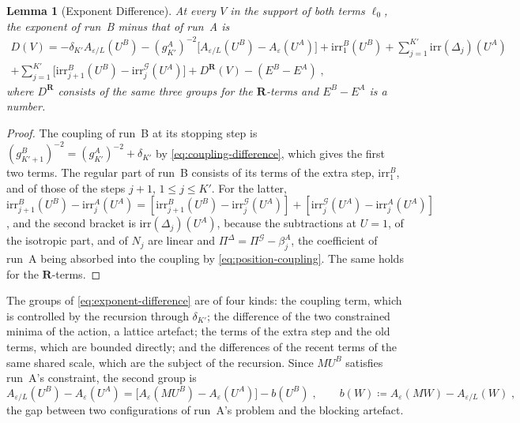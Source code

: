 \documentclass[11pt]{preprint}
\numberwithin{equation}{section}
\newtheorem{lemma}[theorem]{Lemma}
\theoremstyle{definition}
\theoremstyle{remark}
\theoremstyle{plain}
\begin{document}
\begin{lemma}[Exponent Difference]\label{lem:exponent-difference}
At every $V$ in the support of both terms $\ell_0$, the exponent of run~B minus that of run~A is
\begin{multline}\label{eq:exponent-difference}
    D(V) = -\delta_{K'}A_{\varepsilon/L}(U^B) - (g^A_{K'})^{-2}\bigl[A_{\varepsilon/L}(U^B) - A_\varepsilon(U^A)\bigr] + \mathrm{irr}^B_1(U^B) + \sum_{j=1}^{K'}\mathrm{irr}(\Delta_j)(U^A)\\
    + \sum_{j=1}^{K'}\bigl[\mathrm{irr}^B_{j+1}(U^B) - \mathrm{irr}^{\mathcal G}_j(U^A)\bigr] + D^{\mathbf R}(V) - (E^B - E^A)\;,
\end{multline}
where $D^{\mathbf R}$ consists of the same three groups for the $\mathbf R$-terms and $E^B - E^A$ is a number.
\end{lemma}

\begin{proof}
The coupling of run~B at its stopping step is $(g^B_{K'+1})^{-2} = (g^A_{K'})^{-2} + \delta_{K'}$ by \eqref{eq:coupling-difference}, which gives the first two terms. The regular part of run~B consists of its terms of the extra step, $\mathrm{irr}^B_1$, and of those of the steps $j + 1$, $1 \leq j \leq K'$. For the latter, $\mathrm{irr}^B_{j+1}(U^B) - \mathrm{irr}^A_j(U^A) = [\mathrm{irr}^B_{j+1}(U^B) - \mathrm{irr}^{\mathcal G}_j(U^A)] + [\mathrm{irr}^{\mathcal G}_j(U^A) - \mathrm{irr}^A_j(U^A)]$, and the second bracket is $\mathrm{irr}(\Delta_j)(U^A)$, because the subtractions at $U = 1$, of the isotropic part, and of $N_j$ are linear and $\Pi^\Delta = \Pi^{\mathcal G} - \beta^A_j$, the coefficient of run~A being absorbed into the coupling by \eqref{eq:position-coupling}. The same holds for the $\mathbf R$-terms.
\end{proof}

The groups of \eqref{eq:exponent-difference} are of four kinds: the coupling term, which is controlled by the recursion through $\delta_{K'}$; the difference of the two constrained minima of the action, a lattice artefact; the terms of the extra step and the old terms, which are bounded directly; and the differences of the recent terms of the same shared scale, which are the subject of the recursion. Since $MU^B$ satisfies run~A's constraint, the second group is
\begin{equation}\label{eq:minima-difference}
    A_{\varepsilon/L}(U^B) - A_\varepsilon(U^A) = \bigl[A_\varepsilon(MU^B) - A_\varepsilon(U^A)\bigr] - b(U^B)\;,
    \qquad
    b(W) \coloneqq A_\varepsilon(MW) - A_{\varepsilon/L}(W)\;,
\end{equation}
the gap between two configurations of run~A's problem and the blocking artefact.
\end{document}
